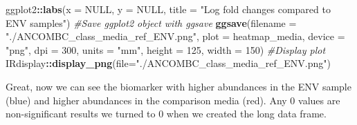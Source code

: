 \documentclass[
]{book}
\newenvironment{Shaded}{\begin{snugshade}}{\end{snugshade}}
\newcommand{\AttributeTok}[1]{\textcolor[rgb]{0.13,0.29,0.53}{#1}}
\newcommand{\CommentTok}[1]{\textcolor[rgb]{0.56,0.35,0.01}{\textit{#1}}}
\newcommand{\ConstantTok}[1]{\textcolor[rgb]{0.56,0.35,0.01}{#1}}
\newcommand{\DecValTok}[1]{\textcolor[rgb]{0.00,0.00,0.81}{#1}}
\newcommand{\FunctionTok}[1]{\textcolor[rgb]{0.13,0.29,0.53}{\textbf{#1}}}
\newcommand{\NormalTok}[1]{#1}
\newcommand{\SpecialCharTok}[1]{\textcolor[rgb]{0.81,0.36,0.00}{\textbf{#1}}}
\newcommand{\StringTok}[1]{\textcolor[rgb]{0.31,0.60,0.02}{#1}}
\begin{document}
\begin{Shaded}
\begin{Highlighting}[]
\NormalTok{                  ggplot2}\SpecialCharTok{::}\FunctionTok{labs}\NormalTok{(}\AttributeTok{x =} \ConstantTok{NULL}\NormalTok{, }\AttributeTok{y =} \ConstantTok{NULL}\NormalTok{,}
                    \AttributeTok{title =} \StringTok{"Log fold changes compared to ENV samples"}\NormalTok{)}
\CommentTok{\#Save ggplot2 object with ggsave}
\FunctionTok{ggsave}\NormalTok{(}\AttributeTok{filename =} \StringTok{"./ANCOMBC\_class\_media\_ref\_ENV.png"}\NormalTok{, }\AttributeTok{plot =}\NormalTok{ heatmap\_media,}
       \AttributeTok{device =} \StringTok{"png"}\NormalTok{, }\AttributeTok{dpi =} \DecValTok{300}\NormalTok{, }\AttributeTok{units =} \StringTok{"mm"}\NormalTok{, }\AttributeTok{height =} \DecValTok{125}\NormalTok{, }\AttributeTok{width =} \DecValTok{150}\NormalTok{)}
\CommentTok{\#Display plot}
\NormalTok{IRdisplay}\SpecialCharTok{::}\FunctionTok{display\_png}\NormalTok{(}\AttributeTok{file=}\StringTok{"./ANCOMBC\_class\_media\_ref\_ENV.png"}\NormalTok{)}
\end{Highlighting}
\end{Shaded}

Great, now we can see the biomarker with higher abundances in the ENV sample (blue) and higher abundances in the comparison media (red).
Any 0 values are non-significant results we turned to 0 when we created the long data frame.
\end{document}
